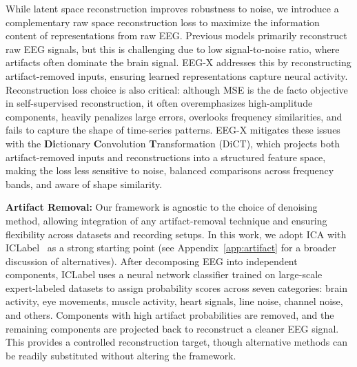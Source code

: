 \documentclass{article} %
\begin{document}
While latent space reconstruction improves robustness to noise, we introduce a complementary raw space reconstruction loss to maximize the information content of representations from raw EEG. Previous models primarily reconstruct raw EEG signals, but this is challenging due to low signal-to-noise ratio, where artifacts often dominate the brain signal. EEG-X addresses this by reconstructing artifact-removed inputs, ensuring learned representations capture neural activity. Reconstruction loss choice is also critical: although MSE is the de facto objective in self-supervised reconstruction, it often overemphasizes high-amplitude components, heavily penalizes large errors, overlooks frequency similarities, and fails to capture the shape of time-series patterns. EEG-X mitigates these issues with the \textbf{Di}ctionary \textbf{C}onvolution \textbf{T}ransformation (DiCT), which projects both artifact-removed inputs and reconstructions into a structured feature space, making the loss less sensitive to noise, balanced comparisons across frequency bands, and aware of shape similarity.

\textbf{Artifact Removal:}  
Our framework is agnostic to the choice of denoising method, allowing integration of any artifact-removal technique and ensuring flexibility across datasets and recording setups. In this work, we adopt ICA with ICLabel~\citep{IClabel} as a strong starting point (see Appendix~\ref{app:artifact} for a broader discussion of alternatives). After decomposing EEG into independent components, ICLabel uses a neural network classifier trained on large-scale expert-labeled datasets to assign probability scores across seven categories: brain activity, eye movements, muscle activity, heart signals, line noise, channel noise, and others. Components with high artifact probabilities are removed, and the remaining components are projected back to reconstruct a cleaner EEG signal. This provides a controlled reconstruction target, though alternative methods can be readily substituted without altering the framework.
\end{document}
